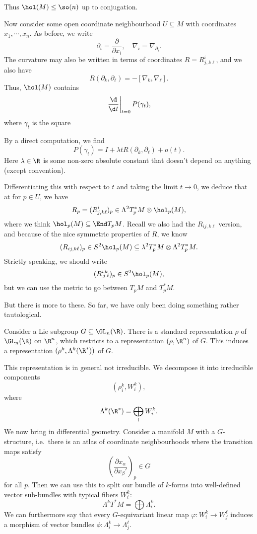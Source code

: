 \documentclass[a4paper]{article}
\begin{document}
Thus $\hol(M) \leq \so(n)$ up to conjugation.

Now consider some open coordinate neighbourhood $U \subseteq M$ with coordinates $x_1, \cdots, x_n$. As before, we write
\[
  \partial_i = \frac{\partial}{\partial x_i},\quad \nabla_i = \nabla_{\partial_i}.
\]
The curvature may also be written in terms of coordinates $R = R^i_{j,k\ell}$, and we also have
\[
  R(\partial_k, \partial_\ell) = - [\nabla_k, \nabla_\ell].
\]
Thus, $\hol(M)$ contains
\[
  \left.\frac{\d}{\d t} \right|_{t = 0} P(\gamma_t),
\]
where $\gamma_t$ is the square
\begin{center}
\end{center}
By a direct computation, we find
\[
  P(\gamma_t) = I + \lambda t R(\partial_k, \partial_\ell) + o(t).
\]
Here $\lambda\in \R$ is some non-zero absolute constant that doesn't depend on anything (except convention).

Differentiating this with respect to $t$ and taking the limit $t\to 0$, we deduce that at for $p \in U$, we have
\[
  R_p = (R^i_{j, k\ell})_p \in \Lambda^2 T^*_p M \otimes \hol_p(M),
\]
where we think $\hol_p(M) \subseteq \End T_p M$. Recall we also had the $R_{ij, k\ell}$ version, and because of the nice symmetric properties of $R$, we know
\[
  (R_{ij, k\ell})_p \in S^2 \hol_p(M) \subseteq \lambda^2 T^*_p M \otimes \Lambda^2 T_p^* M.
\]
Strictly speaking, we should write
\[
  (R^i\!_j\!^k\!_\ell)_p \in S^2 \hol_p(M),
\]
but we can use the metric to go between $T_pM$ and $T^*_p M$.

But there is more to these. So far, we have only been doing something rather tautological.

Consider a Lie subgroup $G \subseteq \GL_n(\R)$. There is a standard representation $\rho$ of $\GL_n(\R)$ on $\R^n$, which restricts to a representation $(\rho, \R^n)$ of $G$. This induces a representation $(\rho^k, \Lambda^k(\R^*))$ of $G$.

This representation is in general not irreducible. We decompose it into irreducible components
\[
  (\rho^k_i, W_i^k),
\]
where
\[
  \Lambda^k(\R^*) = \bigoplus_i W_i^k.
\]
We now bring in differential geometry. Consider a manifold $M$ with a $G$-structure, i.e.\ there is an atlas of coordinate neighbourhoods where the transition maps satisfy
\[
  \left(\frac{\partial x_\alpha}{\partial x_\beta'}\right)_p \in G
\]
for all $p$. Then we can use this to split our bundle of $k$-forms into well-defined vector sub-bundles with typical fibers $W_i^k$:
\[
  \Lambda^k T^* M = \bigoplus \Lambda^k_i.
\]
We can furthermore say that every $G$-equivariant linear map $\varphi: W_i^k \to W_j^\ell$ induces a morphism of vector bundles $\phi: \Lambda_i^k \to \Lambda_j^\ell$.
\end{document}

